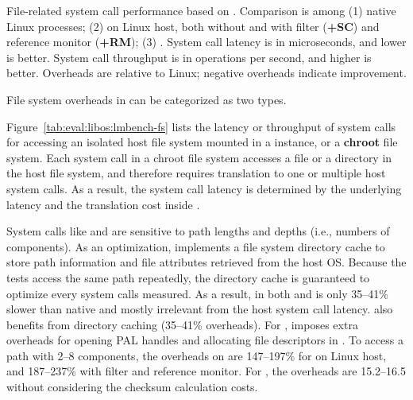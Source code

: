 \label{sec:eval:libos:fs}


\begin{table}[t!b!]

\caption{File-related system call performance based on \lmbench{}. 
Comparison is among (1) native Linux processes; (2) \graphene{} on Linux host, both without and with \seccomp{} filter ({\bf +SC}) and reference monitor ({\bf +RM}); (3) \graphenesgx{}.
System call latency is in microseconds, and lower is better.
System call throughput is in operations per second, and higher is better. 
Overheads are relative to Linux; negative overheads indicate improvement.} 
\label{tab:eval:libos:lmbench-fs}
\end{table}


File system overheads in \thelibos{}
can be categorized as two types.



Figure~\ref{tab:eval:libos:lmbench-fs}
lists the latency or throughput of system calls
for accessing an isolated host file system mounted in a \thelibos{} instance,
or a {\bf chroot} file system.
Each system call in a chroot file system
accesses a file or a directory in the host file system,
and therefore requires
translation to one or multiple
host system calls.
As a result, the system call latency
is determined by the underlying \hostapi{} latency and the translation cost inside \thelibos{}.



System calls like  and 
are sensitive to path lengths and depths (i.e., numbers of components).
As an optimization,
\thelibos{} implements a file system directory cache
to store path information and file attributes retrieved from the host OS.
Because the \lmbench{} tests %
access the same path repeatedly,
the directory cache
is guaranteed to optimize every system calls measured.
As a result,
 in both \graphene{} and \graphenesgx{} is only 35--41\% slower than native
and mostly irrelevant from the host system call latency. 
 also benefits from directory caching
(35--41\% overheads).
For , %
\graphene{} imposes
extra overheads for opening PAL handles and allocating file descriptors in \thelibos{}.
To access a path with 2--8 components,
the overheads on  are 147--197\% for \graphene{} on Linux host, and 187--237\% with \seccomp{} filter and reference monitor.
For \graphenesgx{}, the overheads are 15.2--16.5\x{}
without considering the checksum calculation costs.


